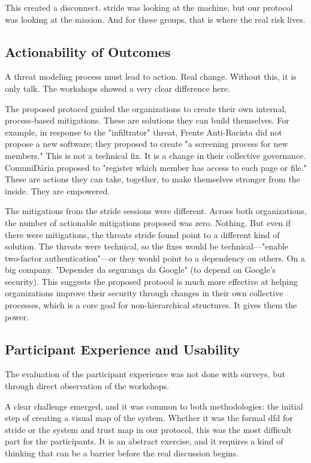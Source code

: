 This created a disconnect. \gls{stride} was looking at the machine, but our protocol
was looking at the mission. And for these groups, that is where the real risk
lives.

\subsection{Actionability of Outcomes}
\label{subsec:actionability_outcomes}

A threat modeling process must lead to action. Real change. Without this, it is
only talk. The workshops showed a very clear difference here.

The proposed protocol guided the organizations to create their own internal,
process-based mitigations. These are solutions they can build themselves. For
example, in response to the "infiltrator" threat, Frente Anti-Racista did not
propose a new software; they proposed to create "a screening process for new
members." This is not a technical fix. It is a change in their collective
governance. ComuniDária proposed to "register which member has access to each
page or file." These are actions they can take, together, to make themselves
stronger from the inside. They are empowered.

The mitigations from the \gls{stride} sessions were different. Across both
organizations, the number of actionable mitigations proposed was zero. Nothing.
But even if there were mitigations, the threats \gls{stride} found point to a
different kind of solution. The threats were technical, so the fixes would be
technical—"enable two-factor authentication"—or they would point to a dependency
on others. On a big company. "Depender da segurança da Google" (to depend on
Google's security). This suggests the proposed protocol is much more effective
at helping organizations improve their security through changes in their own
collective processes, which is a core goal for non-hierarchical structures. It
gives them the power.

\subsection{Participant Experience and Usability}
\label{subsec:participant_outcomes}

The evaluation of the participant experience was not done with surveys, but
through direct observation of the workshops.

A clear challenge emerged, and it was common to both methodologies: the initial
step of creating a visual map of the system. Whether it was the formal \gls{dfd}
for \gls{stride} or the system and trust map in our protocol, this was
the most difficult part for the participants. It is an abstract exercise, and it
requires a kind of thinking that can be a barrier before the real discussion
begins.

